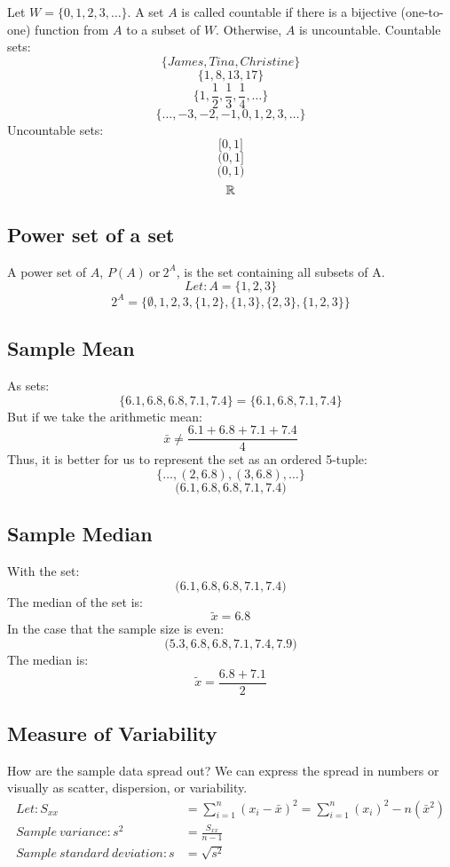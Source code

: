 \documentclass[letterpaper, 12pt]{math}
\begin{document}
Let \( W = \big\{ 0, 1, 2, 3, \dots \big\} \). A set \( A \) is called
countable if there is a bijective (one-to-one) function from \( A \) to a
subset of \( W \). Otherwise, \( A \) is uncountable.
Countable sets:
\[ \bigg\{ James, Tina, Christine \bigg\} \]
\[ \bigg\{ 1, 8, 13, 17 \bigg\} \]
\[ \bigg\{ 1, \frac{1}{2}, \frac{1}{3}, \frac{1}{4}, \dots \bigg\} \]
\[ \bigg\{ \dots, -3, -2, -1, 0, 1, 2, 3, \dots \bigg\} \]
Uncountable sets:
\[ \bigg[ 0, 1 \bigg] \]
\[ \bigg( 0, 1 \bigg] \]
\[ \bigg( 0, 1 \bigg) \]
\[ \mathbb{R} \]

\subsection*{Power set of a set}
A power set of \( A \), \( P(A) \mathrm{\ or\ } 2^{A} \), is the set containing
all subsets of A.
\[ Let: A = \bigg\{ 1, 2, 3 \bigg\} \]
\[ 2^{A} = \bigg\{ \emptyset, 1, 2, 3, \{1, 2\}, \{1, 3\}, \{2, 3\},
   \{1, 2, 3\} \bigg\} \]

\subsection*{Sample Mean}
As sets:
\[ \bigg\{ 6.1, 6.8, 6.8, 7.1, 7.4 \bigg\} =
   \bigg\{ 6.1, 6.8, 7.1, 7.4 \bigg\} \]
But if we take the arithmetic mean:
\[ \bar{x} \neq \frac{6.1+6.8+7.1+7.4}{4} \]
Thus, it is better for us to represent the set as an ordered 5-tuple:
\[ \bigg\{ \dots, (2,6.8), (3,6.8), \dots \bigg \} \]
\[ \bigg( 6.1, 6.8, 6.8, 7.1, 7.4 \bigg) \]

\subsection*{Sample Median}
With the set:
\[ \bigg( 6.1, 6.8, 6.8, 7.1, 7.4 \bigg) \]
The median of the set is:
\[ \tilde{x} = 6.8 \]
In the case that the sample size is even:
\[ \bigg( 5.3, 6.8, 6.8, 7.1, 7.4, 7.9 \bigg) \]
The median is:
\[ \tilde{x} = \frac{6.8+7.1}{2} \]

\subsection*{Measure of Variability}
How are the sample data spread out? We can express the spread in numbers
or visually as scatter, dispersion, or variability.
\begin{align*}
  Let: S_{xx} &= \sum_{i=1}^{n}(x_{i}-\bar{x})^{2} =
    \sum_{i=1}^{n}(x_{i})^{2}-n(\bar{x}^{2}) \\
  Sample\ variance: s^{2} &= \frac{S_{xx}}{n-1} \\
  Sample\ standard\ deviation: s &= \sqrt{s^{2}}
\end{align*}
\end{document}
